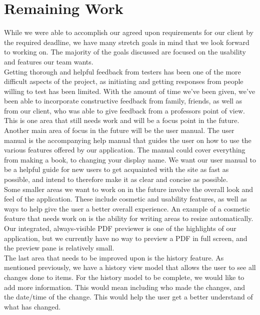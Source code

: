 \documentclass[onecolumn, draftclsnofoot,10pt, compsoc]{IEEEtran}
\begin{document}
\noindent

\section{Remaining Work}

While we were able to accomplish our agreed upon requirements for our client by the
required deadline, we have many stretch goals in mind that we look forward to working on.
The majority of the goals discussed are focused on the usability and features our team wants. \\

\noindent Getting thorough and helpful feedback from testers has been one of the more difficult aspects of the project, as
initiating and getting responses from people willing to test has been limited. With the amount of time
we've been given, we've been able to incorporate constructive feedback from family, friends, as well
as from our client, who was able to give feedback from a professors point of view.
This is one area that still needs work and will be a focus point in the future. \\

\noindent Another main area of focus in the future will be the user manual. The user manual is the accompanying help manual
that guides the user on how to use the various features offered by our application. The manual could cover
everything from making a book, to changing your display name. We want our user manual to be a helpful guide for new users to get
acquainted with the site as fast as possible, and intend to therefore make it as clear and concise as possible. \\

\noindent Some smaller areas we want to work on in the future involve the overall look and feel of the application.
These include cosmetic and usability features, as well as ways to help give the user a better overall experience.
An example of a cosmetic feature that needs work on is the ability for writing areas
to resize automatically. Our integrated, always-visible PDF previewer is one of the highlights of our
application, but we currently have no way to preview a PDF in full screen, and the preview pane is relatively small. \\

\noindent The last area that needs to be improved upon is the history feature. As mentioned previously,
we have a history view model that allows the user to see all changes done to items. For the history model
to be complete, we would like to add more information. This would mean including who made the changes,
and the date/time of the change. This would help the user get a better understand of what has changed. \\
\end{document}
